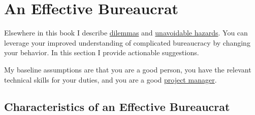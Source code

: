\section{An Effective Bureaucrat\label{sec:effective-bureaucrat}}

Elsewhere in this book I describe 
\hyperref[sec:dilemma-trilemma]{dilemmas} 
and 
\hyperref[sec:unavoidable-hazards]{unavoidable hazards}.
You can leverage your improved understanding of complicated bureaucracy by changing your behavior. In this section I provide actionable suggestions. 

My baseline assumptions are that you are a good person, you have the relevant technical skills for your duties, and you are a good \href{https://en.wikipedia.org/wiki/Project_management}{project manager}.

\subsection*{Characteristics of an Effective Bureaucrat}

